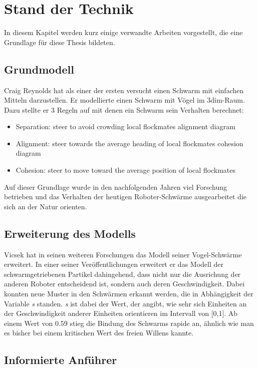 \chapter{Stand der Technik}

In diesem Kapitel werden kurz einige verwandte Arbeiten vorgestellt, die eine Grundlage für diese Thesis bildeten.

\section{Grundmodell}

Craig Reynolds hat als einer der ersten versucht einen Schwarm mit einfachen Mitteln darzustellen. Er modellierte einen Schwarm mit Vögel im 3dim-Raum. Dazu stellte er 3 Regeln auf mit denen ein Schwarm sein Verhalten berechnet:
\begin{itemize}
\item Separation: steer to avoid crowding local flockmates
alignment diagram 	
\item Alignment: steer towards the average heading of local flockmates
cohesion diagram 	
\item Cohesion: steer to move toward the average position of local flockmates 
\end{itemize}
Auf dieser Grundlage wurde in den nachfolgenden Jahren viel Forschung betrieben und das Verhalten der heutigen Roboter-Schwärme ausgearbeitet die sich an der Natur orienten.\cite{CraigReynolds_Boids}

\section{Erweiterung des Modells}
Vicsek hat in seinen weiteren Forschungen das Modell seiner Vogel-Schwärme erweitert. In einer seiner Veröffentlichungen erweitert er das Modell der schwarmgetriebenen Partikel dahingehend, dass nicht nur die Ausrichung der anderen Roboter entscheidend ist, sondern auch deren Geschwindigkeit.
Dabei konnten neue Muster in den Schwärmen erkannt werden, die in Abhängigkeit der Variable \textit{s} standen. \textit{s} ist dabei der Wert, der angibt, wie sehr sich Einheiten an der Geschwindigkeit anderer Einheiten orientieren im Intervall von [0,1]. Ab einem Wert von 0.59 stieg die Bindung des Schwarms rapide an, ähnlich wie man es bisher bei einem kritischen Wert des freien Willens kannte.\cite{VicsekAcceleration} 

\section{Informierte Anführer}

